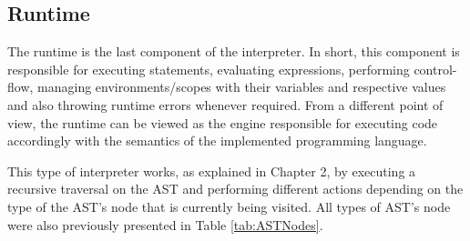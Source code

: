 \subsection{Runtime}
The runtime is the last component of the interpreter. In short, this component is responsible for executing statements, evaluating expressions, performing control-flow, managing environments/scopes with their variables and respective values and also throwing runtime errors whenever required. From a different point of view, the runtime can be viewed as the engine responsible for executing code accordingly with the semantics of the implemented programming language.

This type of interpreter works, as explained in Chapter 2, by executing a recursive traversal on the AST and performing different actions depending on the type of the AST's node that is currently being visited. All types of AST's node were also previously presented in Table \ref{tab:ASTNodes}.


